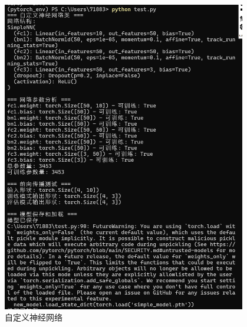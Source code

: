 \documentclass[UTF8]{ctexart}
\begin{document}
\begin{figure}[H]
    \centering
    \includegraphics[width=0.95\textwidth]{picture/自定义神经网络.png}%
    \caption{自定义神经网络}
\end{figure}
\end{document}
